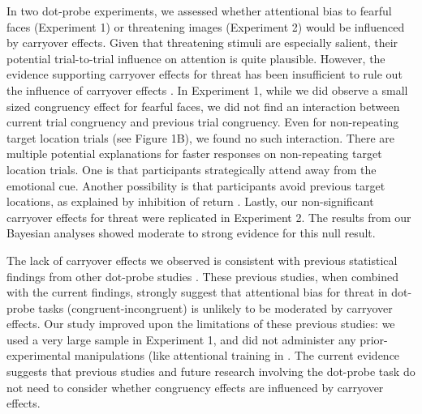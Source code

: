 \documentclass{article}
\begin{document}
{	In two dot-probe experiments, we assessed whether attentional bias to fearful faces (Experiment 1) or threatening images (Experiment 2) would be influenced by carryover effects. Given that threatening stimuli are especially salient, their potential trial-to-trial influence on attention is quite plausible. However, the evidence supporting carryover effects for threat has been insufficient to rule out the influence of carryover effects \parencite{Gladwin2019a, Hill2016}. In Experiment 1, while we did observe a small sized congruency effect for fearful faces, we did not find an interaction between current trial congruency and previous trial congruency. Even for non-repeating target location trials (see Figure 1B), we found no such interaction. There are multiple potential explanations for faster responses on non-repeating target location trials. One is that participants strategically attend away from the emotional cue. Another possibility is that participants avoid previous target locations, as explained by inhibition of return \parencite{Posner1985}. Lastly, our non-significant carryover effects for threat were replicated in Experiment 2. The results from our Bayesian analyses showed moderate to strong evidence for this null result.



	The lack of carryover effects we observed is consistent with previous statistical findings from other dot-probe studies \parencite{Gladwin2017, Hill2016}\parencite{Hill2016}. These previous studies, when combined with the current findings, strongly suggest that attentional bias for threat in dot-probe tasks (congruent-incongruent) is unlikely to be moderated by carryover effects. Our study improved upon the limitations of these previous studies: we used a very large sample in Experiment 1, and did not administer any prior-experimental manipulations (like attentional training in \parencite{Hill2016}. The current evidence suggests that previous studies and future research involving the dot-probe task do not need to consider whether congruency effects are influenced by carryover effects.



}
\end{document}
